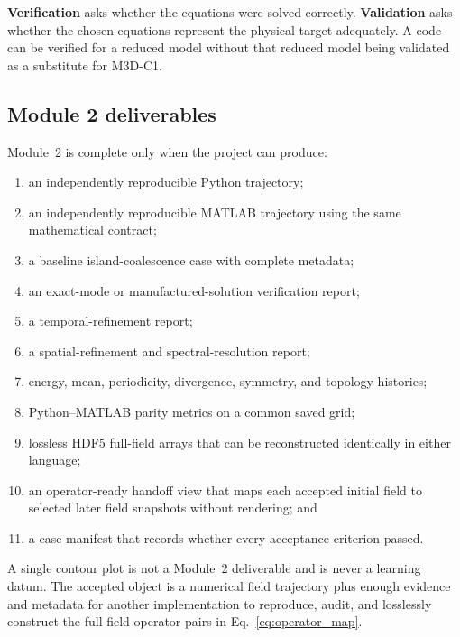 \documentclass[11pt]{article}
\begin{document}
\begin{definitionbox}
\textbf{Verification} asks whether the equations were solved correctly. \textbf{Validation} asks whether the chosen equations represent the physical target adequately. A code can be verified for a reduced model without that reduced model being validated as a substitute for M3D-C1.
\end{definitionbox}

\subsection{Module 2 deliverables}

Module~2 is complete only when the project can produce:
\begin{enumerate}[label=\arabic*.]
  \item an independently reproducible Python trajectory;
  \item an independently reproducible MATLAB trajectory using the same mathematical contract;
  \item a baseline island-coalescence case with complete metadata;
  \item an exact-mode or manufactured-solution verification report;
  \item a temporal-refinement report;
  \item a spatial-refinement and spectral-resolution report;
  \item energy, mean, periodicity, divergence, symmetry, and topology histories;
  \item Python--MATLAB parity metrics on a common saved grid;
  \item lossless HDF5 full-field arrays that can be reconstructed identically in either language;
  \item an operator-ready handoff view that maps each accepted initial field to selected later field snapshots without rendering; and
  \item a case manifest that records whether every acceptance criterion passed.
\end{enumerate}

\begin{resultbox}
A single contour plot is not a Module~2 deliverable and is never a learning datum. The accepted object is a numerical field trajectory plus enough evidence and metadata for another implementation to reproduce, audit, and losslessly construct the full-field operator pairs in Eq.~\eqref{eq:operator_map}.
\end{resultbox}
\end{document}

